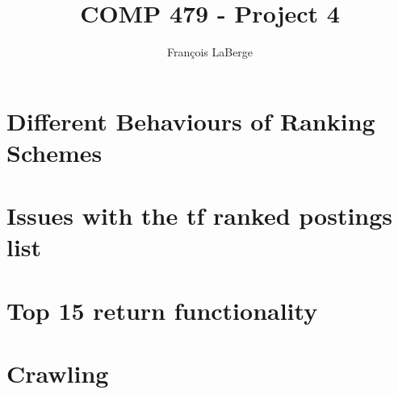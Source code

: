 \documentclass[]{article}
\title{COMP 479 - Project 4}
\author{François LaBerge}
\begin{document}
\maketitle

\section{Different Behaviours of Ranking Schemes}
\section{Issues with the tf ranked postings list}
\section{Top 15 return functionality}
\section{Crawling}
\end{document}
